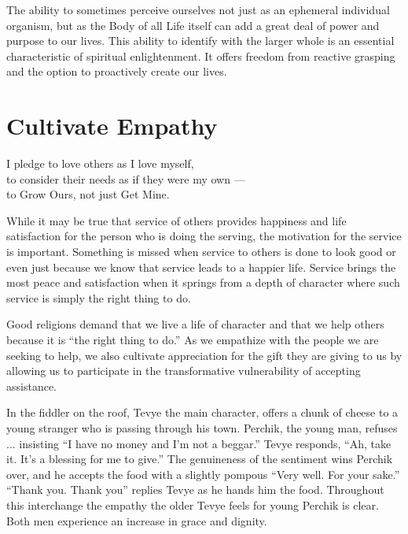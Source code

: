 \documentclass[ebook,12pt,openany,twoside]{memoir}
\newcommand{\imagefacingchapter}[1]{
  \cleartoverso
  \clearpage \null
  \thispagestyle{cleared}
  \AddToShipoutPictureBG*{%
    \AtStockLowerLeft{%
      \texttt{[image: \#1]}
    }
  }
  \clearpage
}
\begin{document}
The ability to sometimes perceive ourselves not just as an ephemeral individual
organism, but as the Body of all Life itself can add a great deal of power and
purpose to our lives. This ability to identify with the larger whole is an
essential characteristic of spiritual enlightenment. It offers freedom from
reactive grasping and the option to proactively create our lives.




\imagefacingchapter{images/CultivateEmpathy}
\chapter{Cultivate Empathy}
\setlength\epigraphwidth{3.4in}
\epigraph{
  I pledge to love others as I love myself,\\
  to consider their needs as if they were my own ---\\
  to Grow Ours, not just Get Mine.
}{}

\noindent While it may be true that service of others provides happiness and
life satisfaction for the person who is doing the serving, the motivation for
the service is important. Something is missed when service to others is done to
look good or even just because we know that service leads to a happier life.
Service brings the most peace and satisfaction when it springs from a depth of
character where such service is simply the right thing to do.

Good religions demand that we live a life of character and that we help others
because it is ``the right thing to do.'' As we empathize with the people we are
seeking to help, we also cultivate appreciation for the gift they are giving to
us by allowing us to participate in the transformative vulnerability of
accepting assistance.

In the fiddler on the roof, Tevye the main character, offers a chunk of cheese
to a young stranger who is passing through his town. Perchik, the young man,
refuses ... insisting ``I have no money and I'm not a beggar.'' Tevye responds,
``Ah, take it. It's a blessing for me to give.'' The genuineness of the sentiment
wins Perchik over, and he accepts the food with a slightly pompous ``Very well.
For your sake.'' ``Thank you. Thank you'' replies Tevye as he hands him the food.
Throughout this interchange the empathy the older Tevye feels for young Perchik
is clear. Both men experience an increase in grace and dignity.



\imagefacingchapter{images/WisdomIsEffective}
\end{document}
